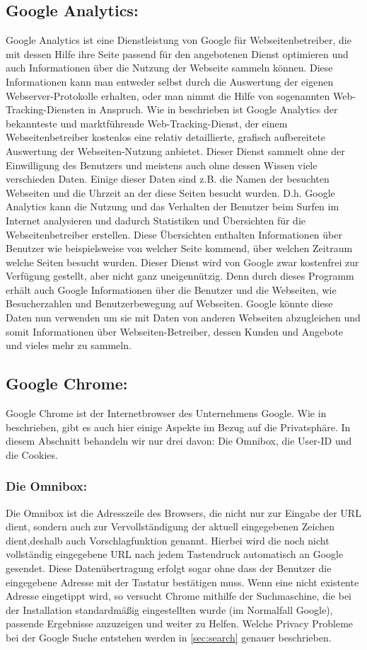 \documentclass[12pt, a4paper]{llncs}
\begin{document}
	\subsection{Google Analytics:}
	Google Analytics ist eine Dienstleistung von Google für Webseitenbetreiber, die mit dessen Hilfe ihre Seite passend für den angebotenen Dienst optimieren und auch Informationen über die Nutzung der Webseite sammeln können. Diese Informationen kann man entweder selbst durch die Auswertung der eigenen Webserver-Protokolle erhalten, oder man nimmt die Hilfe von sogenannten Web-Tracking-Diensten in Anspruch.
	Wie in \cite{1} beschrieben ist Google Analytics der bekannteste und marktführende Web-Tracking-Dienst, der einem Webseitenbetreiber kostenlos eine relativ detaillierte, grafisch aufbereitete Auswertung der
	Webseiten-Nutzung anbietet. Dieser Dienst sammelt ohne der Einwilligung des Benutzers und meistens auch ohne dessen Wissen viele verschieden Daten. Einige dieser Daten sind z.B. die Namen der besuchten Webseiten und die Uhrzeit an der diese Seiten besucht wurden. D.h. Google Analytics kann die Nutzung und das Verhalten der Benutzer beim Surfen im Internet analysieren und dadurch Statistiken und Übersichten für die Webseitenbetreiber erstellen. Diese Übersichten enthalten Informationen über Benutzer wie beispielsweise von welcher Seite kommend, über welchen Zeitraum welche Seiten besucht wurden.
	Dieser Dienst wird von Google zwar kostenfrei zur Verfügung gestellt, aber nicht ganz uneigennützig.
	Denn durch dieses Programm erhält auch Google Informationen über die Benutzer und die Webseiten, wie Besucherzahlen und Benutzerbewegung auf Webseiten. Google könnte diese Daten nun verwenden um sie mit Daten von anderen Webseiten abzugleichen und somit Informationen über Webseiten-Betreiber, dessen Kunden und Angebote und vieles mehr zu sammeln.
	\\
	\subsection{Google Chrome:}
	Google Chrome ist der Internetbrowser des Unternehmens Google. Wie in \cite{2} beschrieben, gibt es auch hier einige Aspekte im Bezug auf die Privatsphäre. In diesem Abschnitt behandeln wir nur drei davon: Die Omnibox, die User-ID und die Cookies. 
	\\
	\subsubsection{Die Omnibox:}
	Die Omnibox ist die Adresszeile des Browsers, die nicht nur zur Eingabe der URL dient, sondern auch zur Vervollständigung der aktuell eingegebenen Zeichen dient,deshalb auch Vorschlagfunktion genannt. Hierbei wird die noch nicht vollständig eingegebene URL nach jedem Tastendruck automatisch an Google gesendet. Diese Datenübertragung erfolgt sogar ohne dass der Benutzer die eingegebene Adresse mit der Tastatur bestätigen muss. Wenn eine nicht existente Adresse eingetippt wird, so versucht Chrome mithilfe der Suchmaschine, die bei der Installation standardmäßig eingestellten wurde (im Normalfall Google), passende Ergebnisse anzuzeigen und weiter zu Helfen. Welche Privacy Probleme bei der Google Suche entstehen werden in \ref{sec:search} genauer beschrieben.
\end{document}
